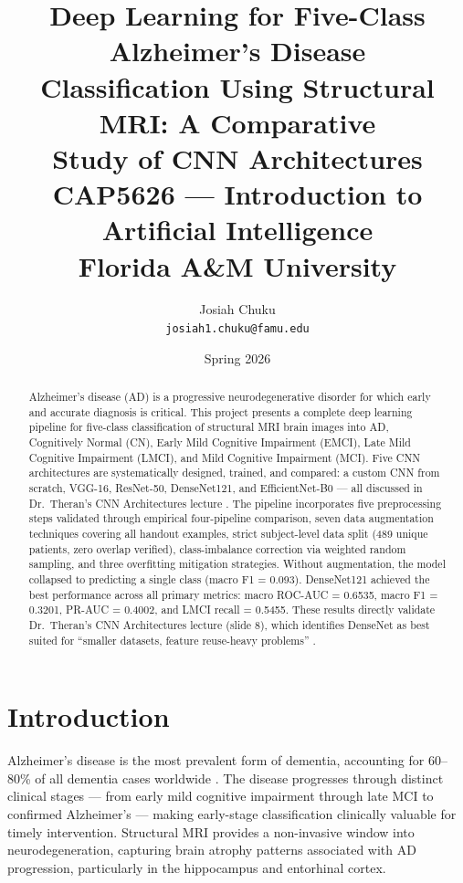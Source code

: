 \documentclass[12pt, a4paper]{article}
\title{
    \textbf{Deep Learning for Five-Class Alzheimer's Disease\\
    Classification Using Structural MRI: A Comparative\\
    Study of CNN Architectures}\\[0.5em]
    \large CAP5626 --- Introduction to Artificial Intelligence\\
    Florida A\&M University
}
\author{Josiah Chuku\\\texttt{josiah1.chuku@famu.edu}}
\date{Spring 2026}
\begin{document}
\maketitle
\thispagestyle{empty}

\begin{abstract}
Alzheimer's disease (AD) is a progressive neurodegenerative
disorder for which early and accurate diagnosis is critical.
This project presents a complete deep learning pipeline for
five-class classification of structural MRI brain images into
AD, Cognitively Normal (CN), Early Mild Cognitive Impairment
(EMCI), Late Mild Cognitive Impairment (LMCI), and Mild
Cognitive Impairment (MCI). Five CNN architectures are
systematically designed, trained, and compared: a custom CNN
from scratch, VGG-16, ResNet-50, DenseNet121, and
EfficientNet-B0 --- all discussed in Dr.\ Theran's CNN
Architectures lecture \cite{theran2026cnn}. The pipeline
incorporates five preprocessing steps validated through
empirical four-pipeline comparison, seven data augmentation
techniques covering all handout examples, strict subject-level
data split (489 unique patients, zero overlap verified),
class-imbalance correction via weighted random sampling, and
three overfitting mitigation strategies. Without augmentation,
the model collapsed to predicting a single class (macro F1 =
0.093). DenseNet121 achieved the best performance across all
primary metrics: macro ROC-AUC = 0.6535, macro F1 = 0.3201,
PR-AUC = 0.4002, and LMCI recall = 0.5455. These results
directly validate Dr.\ Theran's CNN Architectures lecture
(slide 8), which identifies DenseNet as best suited for
``smaller datasets, feature reuse-heavy problems''
\cite{theran2026cnn}.
\end{abstract}

\newpage
\tableofcontents
\newpage

\section{Introduction}

Alzheimer's disease is the most prevalent form of dementia,
accounting for 60--80\% of all dementia cases worldwide
\cite{lim2022}. The disease progresses through distinct
clinical stages --- from early mild cognitive impairment
through late MCI to confirmed Alzheimer's --- making
early-stage classification clinically valuable for timely
intervention. Structural MRI provides a non-invasive window
into neurodegeneration, capturing brain atrophy patterns
associated with AD progression, particularly in the
hippocampus and entorhinal cortex.
\end{document}
